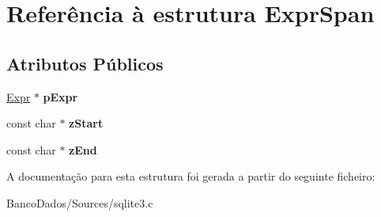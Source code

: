 \hypertarget{struct_expr_span}{\section{Referência à estrutura Expr\-Span}
\label{struct_expr_span}
}
\subsection*{Atributos Públicos}
\begin{DoxyCompactItemize}
\item 
\hypertarget{struct_expr_span_a081c4aa031331c8518c1173b2a8335cc}{\hyperlink{struct_expr}{Expr} $\ast$ {\bfseries p\-Expr}}\label{struct_expr_span_a081c4aa031331c8518c1173b2a8335cc}

\item 
\hypertarget{struct_expr_span_af4653638d7e67a62e7a607f682b38e25}{const char $\ast$ {\bfseries z\-Start}}\label{struct_expr_span_af4653638d7e67a62e7a607f682b38e25}

\item 
\hypertarget{struct_expr_span_a7cdf42cea729fcb5a1c477c3825ab575}{const char $\ast$ {\bfseries z\-End}}\label{struct_expr_span_a7cdf42cea729fcb5a1c477c3825ab575}

\end{DoxyCompactItemize}


A documentação para esta estrutura foi gerada a partir do seguinte ficheiro\-:\begin{DoxyCompactItemize}
\item 
Banco\-Dados/\-Sources/sqlite3.\-c\end{DoxyCompactItemize}

